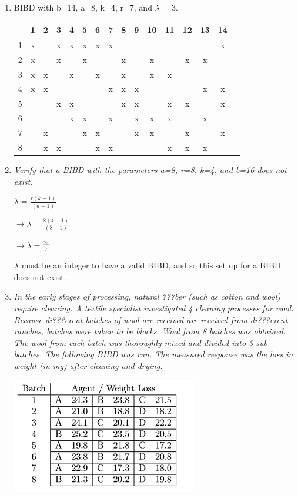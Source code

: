 \documentclass{article}\usepackage[]{graphicx}\usepackage[]{color}
\begin{document}
\begin{enumerate}
\item %

BIBD with b=14, a=8, k=4, r=7, and $\lambda$ = 3.

\begin{center}
\begin{tabular}{ |c|c|c|c|c|c|c|c|c|c|c|c|c|c|c|c| } 
 \hline
 &1&2&3&4&5&6&7&8&9&10&11&12&13&14\\ \hline
 1&x& &x&x&x&x&x& & & & & & &x\\ \hline 
  2&x& &x& &x& & &x& &x& &x&x& \\ \hline
   3&x&x& &x& &x& &x& &x&x& & & \\ \hline
   4&x&x& & & & &x&x&x& & & &x&x\\ \hline
     5& & &x&x& & & &x&x& &x&x& &x\\ \hline
      6& & & &x&x& &x& &x&x&x& &x& \\ \hline
       7& &x& & &x&x& & &x&x& &x& &x\\ \hline
        8& &x&x& & &x&x& & & &x&x&x& \\ \hline
\end{tabular}
\end{center}

\item %
{\it Verify that a BIBD with the parameters a=8, r=8, k=4, and b=16 does not exist.}

$\lambda = \frac{r(k-1)}{(a-1)}$

$\rightarrow \lambda = \frac{8(4-1)}{(8-1)}$

$\rightarrow \lambda = \frac{24}{7}$

$\lambda$ must be an integer to have a valid BIBD, and so this set up for a BIBD does not exist.

\item %

{\it  In the early stages of processing, natural ???ber (such as cotton and wool) require cleaning. A textile specialist investigated 4 cleaning processes for wool. Because di???erent batches of wool are received are received from di???erent ranches, batches were taken to be blocks. Wool from 8 batches was obtained. The wool from each batch was thoroughly mixed and divided into 3 sub-batches. The following BIBD was run. The measured response was the loss in weight (in mg) after cleaning and drying.}

\begin{center}
\includegraphics{prob3pic}
\end{center}



\end{enumerate}
\end{document}
